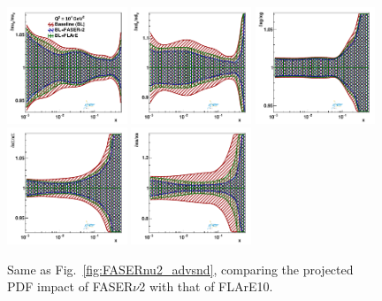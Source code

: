 \begin{figure}[t]
\centering
\includegraphics[width=0.32\textwidth]{plots/proton_fasernu2/FASERv2_vs_FLArE10/statOnly_FLArE10_q2_10000_pdf_uv_ratio.pdf}
\includegraphics[width=0.32\textwidth]{plots/proton_fasernu2/FASERv2_vs_FLArE10/statOnly_FLArE10_q2_10000_pdf_dv_ratio.pdf}
\includegraphics[width=0.32\textwidth]{plots/proton_fasernu2/FASERv2_vs_FLArE10/statOnly_FLArE10_q2_10000_pdf_g_ratio.pdf}\\
\includegraphics[width=0.32\textwidth]{plots/proton_fasernu2/FASERv2_vs_FLArE10/statOnly_FLArE10_q2_10000_pdf_Sea_ratio.pdf}
\includegraphics[width=0.32\textwidth]{plots/proton_fasernu2/FASERv2_vs_FLArE10/statOnly_FLArE10_q2_10000_pdf_s_ratio.pdf}
\caption{
  Same as Fig.~\ref{fig:FASERnu2_advsnd},
  comparing
  the projected PDF impact of FASER$\nu$2 with that of FLArE10. 
}
\label{fig:FASERnu2_FLAre10}
\end{figure}

